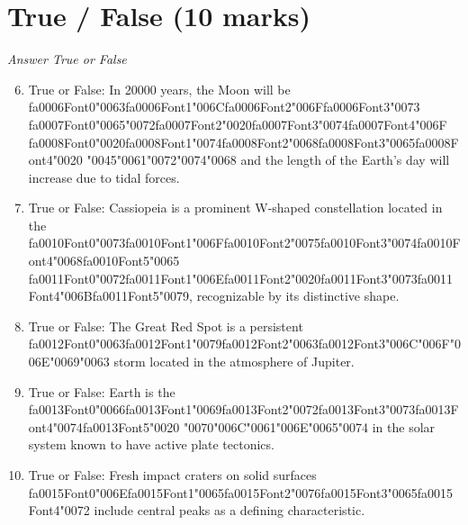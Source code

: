 \documentclass[12pt]{article}
\begin{document}
\section*{True / False (10 marks)}
\textit{Answer True or False}
\begin{enumerate}[label=\arabic*.]
\setcounter{enumi}{5}
\item True or False: In 20000 years, the Moon will be {\csname fa0006Font0\endcsname\char"0063}{\csname fa0006Font1\endcsname\char"006C}{\csname fa0006Font2\endcsname\char"006F}{\csname fa0006Font3\endcsname\char"0073} {\csname fa0007Font0\endcsname\char"0065}{\char"0072}{\csname fa0007Font2\endcsname\char"0020}{\csname fa0007Font3\endcsname\char"0074}{\csname fa0007Font4\endcsname\char"006F} {\csname fa0008Font0\endcsname\char"0020}{\csname fa0008Font1\endcsname\char"0074}{\csname fa0008Font2\endcsname\char"0068}{\csname fa0008Font3\endcsname\char"0065}{\csname fa0008Font4\endcsname\char"0020} {\char"0045}{\char"0061}{\char"0072}{\char"0074}{\char"0068} and the length of the Earth's day will increase due to tidal forces.
\item True or False: Cassiopeia is a prominent W-shaped constellation located in the {\csname fa0010Font0\endcsname\char"0073}{\csname fa0010Font1\endcsname\char"006F}{\csname fa0010Font2\endcsname\char"0075}{\csname fa0010Font3\endcsname\char"0074}{\csname fa0010Font4\endcsname\char"0068}{\csname fa0010Font5\endcsname\char"0065} {\csname fa0011Font0\endcsname\char"0072}{\csname fa0011Font1\endcsname\char"006E}{\csname fa0011Font2\endcsname\char"0020}{\csname fa0011Font3\endcsname\char"0073}{\csname fa0011Font4\endcsname\char"006B}{\csname fa0011Font5\endcsname\char"0079}, recognizable by its distinctive shape.
\item True or False: The Great Red Spot is a persistent {\csname fa0012Font0\endcsname\char"0063}{\csname fa0012Font1\endcsname\char"0079}{\csname fa0012Font2\endcsname\char"0063}{\csname fa0012Font3\endcsname\char"006C}{\char"006F}{\char"006E}{\char"0069}{\char"0063} storm located in the atmosphere of Jupiter.
\item True or False: Earth is the {\csname fa0013Font0\endcsname\char"0066}{\csname fa0013Font1\endcsname\char"0069}{\csname fa0013Font2\endcsname\char"0072}{\csname fa0013Font3\endcsname\char"0073}{\csname fa0013Font4\endcsname\char"0074}{\csname fa0013Font5\endcsname\char"0020} {\char"0070}{\char"006C}{\char"0061}{\char"006E}{\char"0065}{\char"0074} in the solar system known to have active plate tectonics.
\item True or False: Fresh impact craters on solid surfaces {\csname fa0015Font0\endcsname\char"006E}{\csname fa0015Font1\endcsname\char"0065}{\csname fa0015Font2\endcsname\char"0076}{\csname fa0015Font3\endcsname\char"0065}{\csname fa0015Font4\endcsname\char"0072} include central peaks as a defining characteristic.
\end{enumerate}
\end{document}
